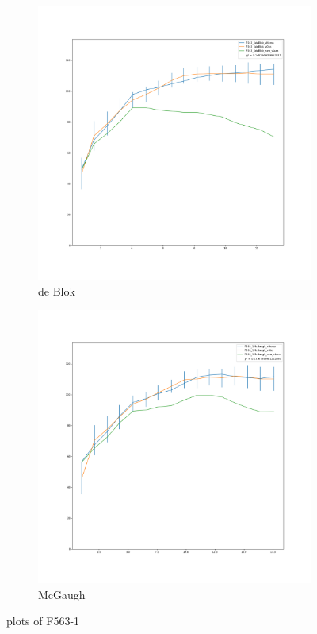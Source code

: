 \documentclass[reprint,%
 amsmath,amssymb,
 aps,
]{revtex4-1}
\begin{document}
 \begin{figure}[h]
\begin{subfigure}{.5\textwidth}
  \centering
  \includegraphics[width=.8\linewidth]{F563_1deBlok_XueSofue.png}
  \caption{de Blok}
  \label{fig:sfig23}
\end{subfigure}%
\begin{subfigure}{.5\textwidth}
  \centering
  \includegraphics[width=.8\linewidth]{F563_1McGaugh_XueSofue.png}
  \caption{McGaugh}
  \label{fig:sfig24}
\end{subfigure}
\caption{plots of F563-1}
\label{fig:figF563-1}
\end{figure}
\clearpage
\end{document}

